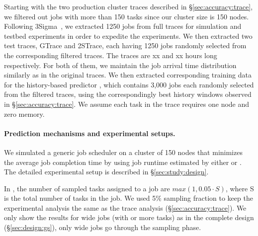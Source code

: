 {Starting with the two production cluster traces described in
  \S\ref{sec:accuracy:trace}, we filtered out jobs with more than 150
  tasks since our cluster size is 150 nodes.
Following 3Sigma~\cite{3Sigma}, we extracted 1250 jobs from full traces for simulation
and testbed experiments in order to expedite the experiments.
% 
We then extracted two test traces, GTrace and 2STrace, each having
1250 jobs randomly selected from the corresponding filtered
traces. The traces are xx and xx hours long respectively.  For
both of them, we maintain the job arrival time distribution similarly
as in the original traces.  We then extracted corresponding training
data for the history-based predictor \primarybasepredict, which
contains 3,000 jobs each randomly selected from the filtered traces,
using the correspondingly best history windows observed in
\S\ref{sec:accuracy:trace}.
\rm{We assume each task in the trace requires one node and zero memory.}
\fi


\paragraph{Prediction mechanisms and experimental setups.}
We simulated a generic job scheduler on a cluster of 150 nodes
that minimizes the average job completion time by using
job runtime estimated by either \lTechnique or \primarybasepredict.
The detailed experimental setup is described in \S\ref{sec:study:design}.

In \lTechnique, the number of sampled tasks assigned to a job are
$max(1, 0.05 \cdot S)$, where S is the total number of tasks in the
job. We used 5\% sampling fraction to keep the experimental analysis
the same as the trace analysis
(\S\ref{sec:accuracy:trace}). {We only show the results for wide
  jobs (with \thinLimit or more tasks) as in the complete \slearn design (\S\ref{sec:design:gs}), only
  wide jobs go through the sampling phase.
  }

}

